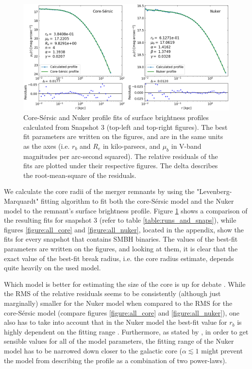 \documentclass[english, oneside]{HYgradu}
\begin{document}
\begin{figure}[h]
	\centering
	\includegraphics[width=\textwidth]{core_nuker_fits.png}
	\caption{Core-Sérsic and Nuker profile fits of surface brightness profiles calculated from Snapshot 3 (top-left and top-right figures). The best fit parameters are written on the figures, and are in the same units as the axes (i.e. $r_b$ and $R_e$ in kilo-parsecs, and $\mu_b$ in V-band magnitudes per arc-second squared). The relative residuals of the fits are plotted under their respective figures. The delta describes the root-mean-square of the residuals.}
	\label{figure:core_nuker}
\end{figure}

We calculate the core radii of the merger remnants by using the "Levenberg-Marquardt" fitting algorithm to fit both the core-Sérsic model and the Nuker model to the remnant's surface brightness profile. Figure \ref{figure:core_nuker} shows a comparison of the resulting fits for snapshot 3 (refer to table \ref{table:runs_and_snaps}), while figures \ref{figure:all_core} and \ref{figure:all_nuker}, located in the appendix, show the fits for every snapshot that contains SMBH binaries. The values of the best-fit parameters are written on the figures, and looking at them, it is clear that the exact value of the best-fit break radius, i.e. the core radius estimate, depends quite heavily on the used model.

Which model is better for estimating the size of the core is up for debate \citep{Lauer2007, Dullo2012}. While the RMS of the relative residuals seems to be consistently (although just marginally) smaller for the Nuker model when compared to the RMS for the core-Sérsic model (compare figures \ref{figure:all_core} and \ref{figure:all_nuker}), one also has to take into account that in the Nuker model the best-fit value for $r_b$ is highly dependent on the fitting range \citep{Graham2003Nuker}. Furthermore, as stated by \cite{Rantala2018}, in order to get sensible values for all of the model parameters, the fitting range of the Nuker model has to be narrowed down closer to the galactic core ($\alpha \lesssim 1$ might prevent the model from describing the profile as a combination of two power-laws).
\end{document}
